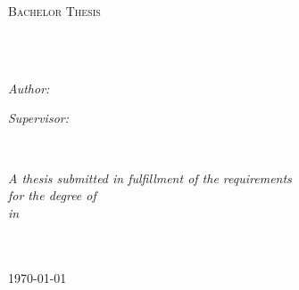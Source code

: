 
\begin{titlepage}
  \begin{center}
  
  {\scshape\LARGE \univname\par}\vspace{1.5cm} %
  
  \textsc{\Large Bachelor Thesis}\\[0.5cm] %
  
  \HRule \\[0.4cm] %
  {\huge \bfseries \ttitle\par}\vspace{0.4cm} %
  
  \HRule \\[1.5cm] %
   
  \begin{minipage}[t]{0.4\textwidth}
  \begin{flushleft} \large
  \emph{Author:}\\
  {\authorname} %
  \end{flushleft}
  \end{minipage}
  \begin{minipage}[t]{0.4\textwidth}
  \begin{flushright} \large
  \emph{Supervisor:} \\
  \href{https://sites.google.com/site/beatrizolmosphysics/}{\supname} %
  \end{flushright}
  \end{minipage}\\[3cm]
   
  \vfill
  
  \large \textit{A thesis submitted in fulfillment of the requirements\\ for the degree of \degreename}\\[0.3cm] %
  \textit{in }\\[0.4cm]
  \groupname\\\deptname\\[2cm] %
   
  \vfill
  
  {\large \today}\\[4cm] %
  
  \vfill
  \end{center}
  \end{titlepage}
  
